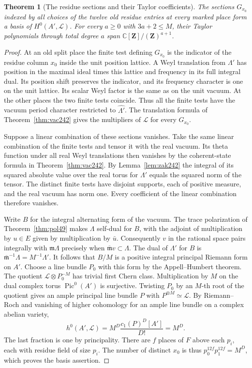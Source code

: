 \documentclass[a4paper,11pt]{article}
\newtheorem{theorem}[proposition]{Theorem}
\theoremstyle{definition}
\theoremstyle{remark}
\numberwithin{equation}{section}
\begin{document}
\begin{theorem}[The residue sections and their Taylor coefficients]
\leavevmode\label{thm:completesystem856}
The sections \(G_{x_0}\) indexed by all choices of the twelve
old residue entries at every marked place form a basis of
\(H^0(A',\mathcal L)\). For every \(a\ge0\) with \(3a+2\le M\),
their Taylor polynomials through total degree \(a\) span
\(\mathbb C[\mathbf Z]/(\mathbf Z)^{a+1}\).
\end{theorem}
\begin{proof}
At an old split place the finite test defining \(G_{x_0}\)
is the indicator of the residue column \(x_0\) inside the
unit position lattice. A Weyl translation from \(\Lambda'\)
has position in the maximal ideal times this lattice and
frequency in its full integral dual. Its position shift
preserves the indicator, and its frequency character is one
on the unit lattice. Its scalar Weyl factor is the same as
on the unit vacuum. At the other places the two finite tests
coincide. Thus all the finite tests have the vacuum period
character restricted to \(\widehat{\Lambda'}\).
The translation formula of Theorem~\ref{thm:vac242} gives
the multipliers of \(\mathcal L\) for every \(G_{x_0}\).

Suppose a linear combination of these sections vanishes. Take
the same linear combination of the finite tests and tensor it
with the real vacuum. Its theta function under all real Weyl
translations then vanishes by the coherent-state formula in
Theorem~\ref{thm:vac242}. By Lemma~\ref{lem:zak242} the integral
of its squared absolute value over the real torus for
\(\Lambda'\) equals the squared norm of the tensor. The
distinct finite tests have disjoint supports, each of positive
measure, and the real vacuum has norm one. Every coefficient
of the linear combination therefore vanishes.

Write \(B\) for the integral alternating form of the vacuum.
The trace polarization of Theorem~\ref{thm:pol49} makes
\(\Lambda\) self-dual for \(B\), with the adjoint of
multiplication by \(u\in E\) given by multiplication by \(\bar u\).
Consequently \(v\) in the rational space pairs integrally
with \(\mathfrak m\Lambda\) precisely when
\(\overline{\mathfrak m}v\subset\Lambda\). The dual of
\(\Lambda'\) for \(B\) is
\(\overline{\mathfrak m}^{-1}\Lambda=M^{-1}\Lambda'\).
It follows that \(B/M\) is a positive integral principal
Riemann form on \(A'\). Choose a line bundle \(P_0\) with
this form by the Appell--Humbert theorem. The quotient
\(\mathcal L\otimes P_0^{-M}\) has trivial first Chern class.
Multiplication by \(M\) on the dual complex torus
\(\operatorname{Pic}^0(A')\) is surjective. Twisting \(P_0\)
by an \(M\)-th root of the quotient gives an ample principal
line bundle \(P\) with \(P^{\otimes M}\simeq\mathcal L\).
By Riemann--Roch and vanishing of higher cohomology for an
ample line bundle on a complex abelian variety,
\[
 h^0(A',\mathcal L)
   =M^D\frac{c_1(P)^D[A']}{D!}=M^D.
\]
The last fraction is one by principality. There are \(f\)
places of \(F\) above each \(p_i\), each with residue field
of size \(p_i\). The number of distinct \(x_0\) is thus
\(p_0^{12f}p_1^{12f}=M^D\), which proves the basis assertion.


\end{proof}
\end{document}

